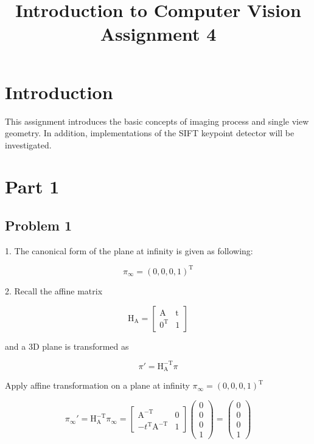 \documentclass[conference]{IEEEtran}
\begin{document}
\title{Introduction to Computer Vision Assignment 4\\
}

\author{
}
\maketitle

\section{Introduction}

This assignment introduces the basic concepts of imaging process and single view geometry. In addition, implementations of the SIFT keypoint detector will be investigated. 

\section{Part 1}

\subsection{Problem 1}

1. The canonical form of the plane at infinity is given as following:

\[ \pi_\infty = (0,0,0,1)^\mathrm{T} \]

2. Recall the affine matrix 

\[ \mathrm{H}_\mathrm{A} =\begin{bmatrix}
\mathrm{A}& \mathrm{t} \\
0^\mathrm{T} & 1
\end{bmatrix}\]

and a 3D plane is transformed as

\[ \pi{'} = \mathrm{H}_\mathrm{A}^\mathrm{-T}\pi\] 

Apply affine transformation on a plane at infinity \( \pi_\infty = (0,0,0,1)^\mathrm{T}\) 

\[ \pi_\infty{'} = \mathrm{H}_\mathrm{A}^\mathrm{-T}\pi_\infty =
\begin{bmatrix}
\mathrm{A}^\mathrm{-T}& 0 \\
-t^\mathrm{T}\mathrm{A}^\mathrm{-T} & 1
\end{bmatrix}\begin{pmatrix} 0\\0\\0\\1 \end{pmatrix} =
\begin{pmatrix} 0\\0\\0\\1 \end{pmatrix}\]
\end{document}
